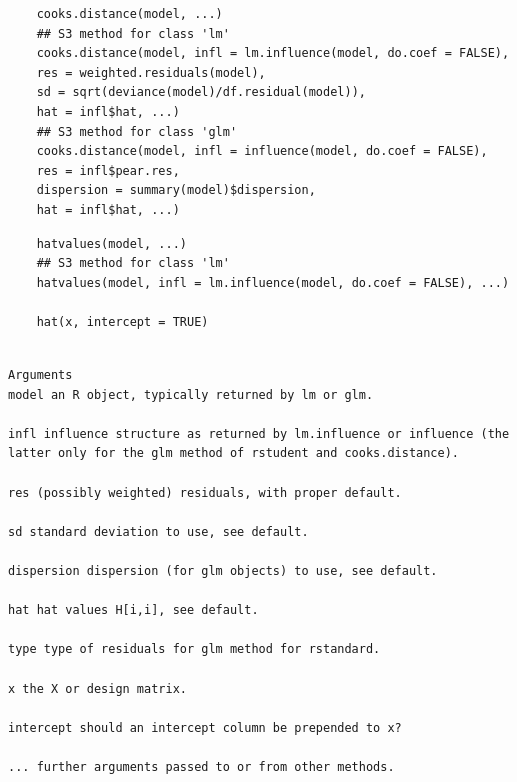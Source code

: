 \documentclass[residuals.tex]{subfiles}
\begin{document}
\begin{framed}
	\begin{verbatim}
	cooks.distance(model, ...)
	## S3 method for class 'lm'
	cooks.distance(model, infl = lm.influence(model, do.coef = FALSE),
	res = weighted.residuals(model),
	sd = sqrt(deviance(model)/df.residual(model)),
	hat = infl$hat, ...)
	## S3 method for class 'glm'
	cooks.distance(model, infl = influence(model, do.coef = FALSE),
	res = infl$pear.res,
	dispersion = summary(model)$dispersion,
	hat = infl$hat, ...)
	\end{verbatim}
\end{framed}

\begin{framed}
	\begin{verbatim}
	hatvalues(model, ...)
	## S3 method for class 'lm'
	hatvalues(model, infl = lm.influence(model, do.coef = FALSE), ...)
	
	hat(x, intercept = TRUE)
	
	\end{verbatim}
\end{framed}
\begin{verbatim}
Arguments
model an R object, typically returned by lm or glm.

infl influence structure as returned by lm.influence or influence (the latter only for the glm method of rstudent and cooks.distance).

res (possibly weighted) residuals, with proper default.

sd standard deviation to use, see default.

dispersion dispersion (for glm objects) to use, see default.

hat hat values H[i,i], see default.

type type of residuals for glm method for rstandard.

x the X or design matrix.

intercept should an intercept column be prepended to x?

... further arguments passed to or from other methods.

\end{verbatim}

\newpage
\end{document}
